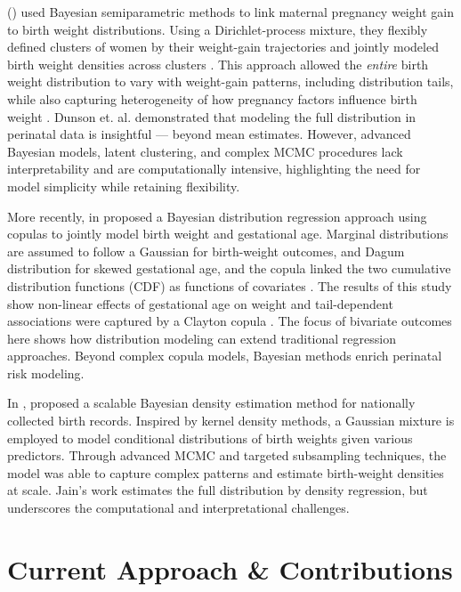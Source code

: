\textcite{dunson2008} (\citeyear{dunson2008}) used Bayesian semiparametric methods to link maternal pregnancy weight gain to birth weight distributions. Using a Dirichlet-process mixture, they flexibly defined clusters of women by their weight-gain trajectories and jointly modeled birth weight densities across clusters \parencite{dunson2008}. This approach allowed the \emph{entire} birth weight distribution to vary with weight-gain patterns, including distribution tails, while also capturing heterogeneity of how pregnancy factors influence birth weight \parencite{dunson2008}. Dunson et. al. demonstrated that modeling the full distribution in perinatal data is insightful — beyond mean estimates. However, advanced Bayesian models, latent clustering, and complex MCMC procedures lack interpretability and are computationally intensive, highlighting the need for model simplicity while retaining flexibility.

More recently, \textcite{rathjens2023} in \citeyear{rathjens2023} proposed a Bayesian distribution regression approach using copulas to jointly model birth weight and gestational age. Marginal distributions are assumed to follow a Gaussian for birth-weight outcomes, and Dagum distribution for skewed gestational age, and the copula linked the two cumulative distribution functions (CDF) as functions of covariates \parencite{rathjens2023}. The results of this study show non-linear effects of gestational age on weight and tail-dependent associations were captured by a Clayton copula \parencite{rathjens2023}. The focus of bivariate outcomes here shows how distribution modeling can extend traditional regression approaches. Beyond complex copula models, Bayesian methods enrich perinatal risk modeling. 

In \citeyear{jain2024}, \textcite{jain2024} proposed a scalable Bayesian density estimation method for nationally collected birth records. Inspired by kernel density methods, a Gaussian mixture is employed to model conditional distributions of birth weights given various predictors. Through advanced MCMC and targeted subsampling techniques, the model was able to capture complex patterns and estimate birth-weight densities at scale. Jain's work estimates the full distribution by density regression, but underscores the computational and interpretational challenges.

\section{Current Approach \& Contributions}
\label{sec:ch2-current-approach}

